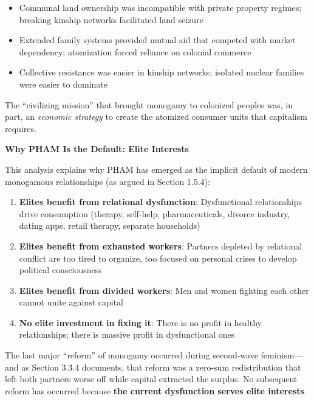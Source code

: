 \documentclass[12pt, letterpaper]{article}
\begin{document}
\begin{itemize}
    \item Communal land ownership was incompatible with private property regimes; breaking kinship networks facilitated land seizure
    \item Extended family systems provided mutual aid that competed with market dependency; atomization forced reliance on colonial commerce
    \item Collective resistance was easier in kinship networks; isolated nuclear families were easier to dominate
\end{itemize}

The ``civilizing mission'' that brought monogamy to colonized peoples was, in part, an \textit{economic strategy} to create the atomized consumer units that capitalism requires.

\textbf{Why PHAM Is the Default: Elite Interests}

This analysis explains why PHAM has emerged as the implicit default of modern monogamous relationships (as argued in Section 1.5.4):

\begin{enumerate}
    \item \textbf{Elites benefit from relational dysfunction}: Dysfunctional relationships drive consumption (therapy, self-help, pharmaceuticals, divorce industry, dating apps, retail therapy, separate households)
    
    \item \textbf{Elites benefit from exhausted workers}: Partners depleted by relational conflict are too tired to organize, too focused on personal crises to develop political consciousness
    
    \item \textbf{Elites benefit from divided workers}: Men and women fighting each other cannot unite against capital
    
    \item \textbf{No elite investment in fixing it}: There is no profit in healthy relationships; there is massive profit in dysfunctional ones
\end{enumerate}

The last major ``reform'' of monogamy occurred during second-wave feminism---and as Section 3.3.4 documents, that reform was a zero-sum redistribution that left both partners worse off while capital extracted the surplus. No subsequent reform has occurred because \textbf{the current dysfunction serves elite interests}.
\end{document}
